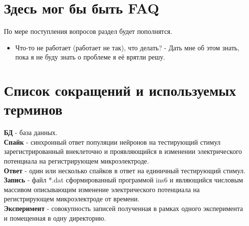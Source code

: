 \documentclass[12pt,a4paper]{report}
\begin{document}
\chapter{Здесь мог бы быть FAQ}
По мере поступления вопросов раздел будет пополнятся.
\begin{itemize}
\item Что-то не работает (работает не так), что делать? - Дать мне об этом знать, пока я не буду знать о проблеме я её врятли решу.
\end{itemize}
\chapter{Список сокращений и используемых терминов}
\textbf{БД} - база данных.\\
\textbf{Спайк} - синхронный ответ популяции нейронов на тестирующий стимул зарегистрированный внеклеточно и проявляющийся в изменении электрического потенциала на регистрирующем микроэлектроде.\\
\textbf{Ответ} - один или несколько спайков в ответ на единичный тестирующий стимул.\\
\textbf{Запись} - файл *.dat сформированный программой ins6 и являющийся числовым массивом описывающим изменение электрического потенциала на регистрирующем микроэлектроде от времени.\\
\textbf{Эксперимент} - совокупность записей полученная в рамках одного эксперимента и помещенная в одну директорию.  
 
\end{document}
